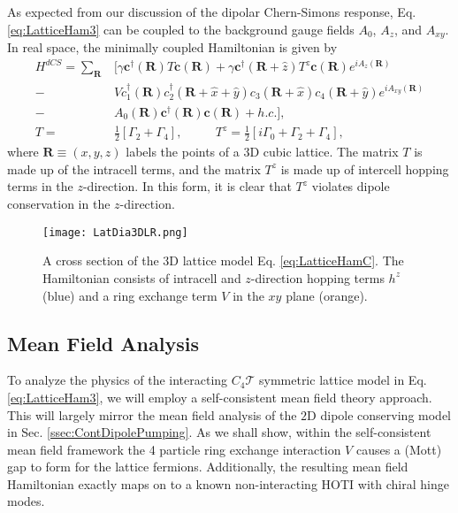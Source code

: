 \documentclass[prb,aps,twocolumn,groupaddress,floatfix]{revtex4-1}
\begin{document}
As expected from our discussion of the dipolar Chern-Simons response, Eq. \ref{eq:LatticeHam3} can be coupled to the  background gauge fields $A_0$, $A_z$, and $A_{xy}$. In real space, the minimally coupled Hamiltonian is given by 
\begin{equation}
\begin{split}
H^{dCS} =\sum_{\bm{R}} &[\gamma \bm{c}^\dagger(\bm{R}) T \bm{c}(\bm{R}) + \gamma \bm{c}^\dagger(\bm{R}+\hat{z}) T^z \bm{c}(\bm{R})e^{i A_z(\bm{R})} \\
  -& V c_1^\dagger(\bm{R})c_2^\dagger(\bm{R}+\hat{x}+\hat{y})c_3(\bm{R}+\hat{x})c_4(\bm{R}+\hat{y})e^{i A_{xy}(\bm{R})} \\
-& A_0(\bm{R})  \bm{c}^\dagger(\bm{R}) \bm{c}(\bm{R})   +h.c. ],\\
T =&  \frac{1}{2}[\Gamma_2 + \Gamma_4], \phantom{==} T^z = \frac{1}{2}[i \Gamma_0 +  \Gamma_2 + \Gamma_4],
\end{split}\label{eq:LatticeHamC}
\end{equation}
where $\bm{R} \equiv (x,y,z)$ labels the points of a $3$D cubic lattice. The matrix $T$ is made up of the intracell terms, and the matrix $T^z$ is made up of intercell hopping terms in the $z$-direction. In this form, it is clear that $T^z$ violates dipole conservation in the $z$-direction.

\begin{figure}\centering
\texttt{[image: LatDia3DLR.png]}
\caption{A cross section of the $3$D lattice model Eq. \ref{eq:LatticeHamC}. The Hamiltonian consists of intracell and $z$-direction hopping terms $h^z$ (blue) and a ring exchange term $V$ in the $xy$ plane (orange).}\label{fig:LatDia}
\end{figure}






\subsection{Mean Field Analysis}\label{ssec:MFC}
To analyze the physics of the interacting $C_4\mathcal{T}$ symmetric lattice model in Eq. \ref{eq:LatticeHam3}, we will employ a self-consistent mean field theory approach. This will largely mirror the mean field analysis of the $2$D dipole conserving model in Sec. \ref{ssec:ContDipolePumping}. As we shall show, within the self-consistent mean field framework the 4 particle ring exchange interaction $V$ causes a (Mott) gap to form for the lattice fermions. Additionally, the resulting mean field Hamiltonian exactly maps on to a known non-interacting HOTI with chiral hinge modes. 
\end{document}
